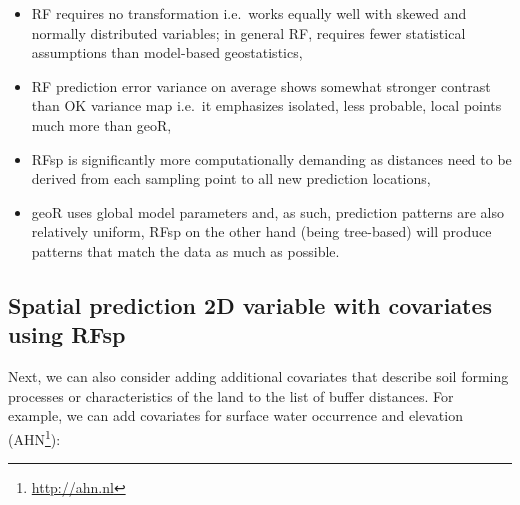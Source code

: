 \documentclass[graybox,natbib,nospthms,UStrade]{svmono}
\newenvironment{Shaded}{\begin{snugshade}}{\end{snugshade}}
\newcommand{\CommentTok}[1]{\textcolor[rgb]{0.37,0.37,0.37}{\textit{#1}}}
\newcommand{\KeywordTok}[1]{\textcolor[rgb]{0.27,0.27,0.27}{\textbf{#1}}}
\newcommand{\NormalTok}[1]{#1}
\newcommand{\OperatorTok}[1]{\textcolor[rgb]{0.43,0.43,0.43}{\textbf{#1}}}
\newcommand{\StringTok}[1]{\textcolor[rgb]{0.5,0.5,0.5}{#1}}
\providecommand{\tightlist}{%
  \setlength{\itemsep}{0pt}\setlength{\parskip}{0pt}}
\providecommand{\tightlist}{\setlength{\itemsep}{0pt}\setlength{\parskip}{0pt}}
\renewcommand{\href}[2]{#2 (\url{#1})}
\renewcommand{\href}[2]{#2\footnote{\url{#1}}}
\begin{document}
\begin{itemize}
\tightlist
\item
  RF requires no transformation i.e.~works equally well with skewed and normally distributed variables; in general RF, requires fewer statistical assumptions than model-based geostatistics,
\item
  RF prediction error variance on average shows somewhat stronger contrast than OK variance map i.e.~it emphasizes isolated, less probable, local points much more than geoR,
\item
  RFsp is significantly more computationally demanding as distances need to be derived from each sampling point to all new prediction locations,
\item
  geoR uses global model parameters and, as such, prediction patterns are also relatively uniform, RFsp on the other hand (being tree-based) will produce patterns that match the data as much as possible.
\end{itemize}

\hypertarget{spatial-prediction-2d-variable-with-covariates-using-rfsp}{%
\subsection{Spatial prediction 2D variable with covariates using RFsp}\label{spatial-prediction-2d-variable-with-covariates-using-rfsp}}

Next, we can also consider adding additional covariates that describe soil forming processes or characteristics of the land to the list of buffer distances. For example, we can add covariates for surface water occurrence \citep{pekel2016high} and elevation (\href{http://ahn.nl}{AHN}):

\begin{Shaded}
\end{Shaded}
\end{document}

